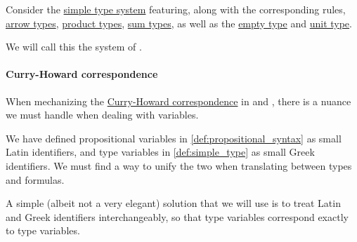 \begin{definition}\label{def:simple_algebraic_types}\mimprovised
  Consider the \hyperref[def:simple_type_system]{simple type system} featuring, along with the corresponding rules, \hyperref[def:arrow_type]{arrow types}, \hyperref[def:simple_product_type]{product types}, \hyperref[def:simple_product_type]{sum types}, as well as the \hyperref[def:simple_empty_type]{empty type} and \hyperref[def:simple_unit_type]{unit type}.

  We will call this the system of .
\end{definition}

\paragraph{Curry-Howard correspondence}

\begin{remark}\label{rem:curry_howard_variables}
  When mechanizing the \hyperref[con:curry_howard_correspondence]{Curry-Howard correspondence} in  and , there is a nuance we must handle when dealing with variables.

  We have defined propositional variables in \cref{def:propositional_syntax} as small Latin identifiers, and type variables in \cref{def:simple_type} as small Greek identifiers. We must find a way to unify the two when translating between types and formulas.

  A simple (albeit not a very elegant) solution that we will use is to treat Latin and Greek identifiers interchangeably, so that type variables correspond exactly to type variables.
\end{remark}

